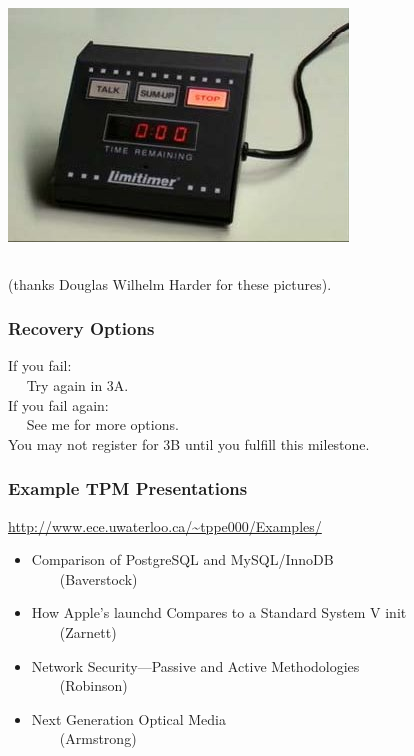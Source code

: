 \documentclass{beamer}
\begin{document}
\begin{frame}
\begin{columns}[c]
\includegraphics[width=.9\columnwidth]{stop}\\
\end{columns}
(thanks Douglas Wilhelm Harder for these pictures).

\end{frame}

\begin{frame}

\frametitle{Recovery Options}

If you fail: \\
$\quad$ Try again in 3A.\\[2em]

If you fail again:\\
$\quad$ See me for more options.\\[2em]

You may not register for 3B until you fulfill this milestone.

\end{frame}

\begin{frame}

\frametitle{Example TPM Presentations}

\url{http://www.ece.uwaterloo.ca/~tppe000/Examples/}

\small
\begin{itemize}
\item Comparison of PostgreSQL and MySQL/InnoDB\\
$\qquad$(Baverstock)
\item How Apple's launchd Compares to a Standard System V init\\
$\qquad$(Zarnett)
\item Network Security---Passive and Active Methodologies\\
$\qquad$(Robinson)
\item Next Generation Optical Media\\
$\qquad$(Armstrong)
\end{itemize}



\end{frame}
\end{document}
